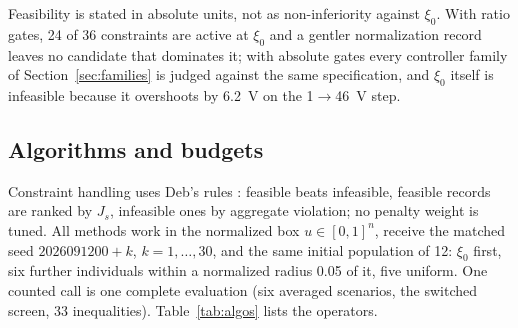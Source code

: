 Feasibility is stated in absolute units, not as non-inferiority against
$\xi_0$. With ratio gates, 24 of 36 constraints are active at $\xi_0$ and a
gentler normalization record leaves no candidate that dominates it; with
absolute gates every controller family of Section~\ref{sec:families} is judged
against the same specification, and $\xi_0$ itself is infeasible because it
overshoots by \SI{6.2}{V} on the 1$\to$46~V step.

\subsection{Algorithms and budgets}\label{sec:algos}
Constraint handling uses Deb's rules \citep{Deb2000}: feasible beats
infeasible, feasible records are ranked by $J_s$, infeasible ones by aggregate
violation; no penalty weight is tuned. All methods work in the normalized box
$u\in[0,1]^n$, receive the matched seed $2026091200+k$, $k=1,\dots,30$, and the same
initial population of 12: $\xi_0$ first, six further individuals within a
normalized radius 0.05 of it, five uniform. One counted call is one complete
evaluation (six averaged scenarios, the switched screen, 33 inequalities).
Table~\ref{tab:algos} lists the operators.

